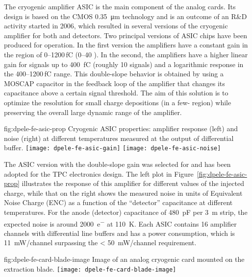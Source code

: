 The cryogenic amplifier ASIC is the main component of the  analog cards. Its design is based on the CMOS \SI{0.35}{\micro\meter} technology and is an outcome of an R\&D  activity started in 2006, which resulted in several versions of the cryogenic amplifier for both \single and \dual {} detectors. Two principal versions of ASIC chips have been produced for \dual {} operation. In the first version the amplifiers have a constant gain in the region of \numrange{0}{1200}\,\si{\femto\coulomb} (\numrange{0}{40} ). In the second, the amplifiers have a higher linear gain for signals up to \SI{400}{\femto\coulomb} (roughly \num{10}  signals) and a logarithmic response in the \numrange{400}{1200}\,\si{\femto\coulomb} range. This double-slope behavior is obtained by using a MOSCAP capacitor in the feedback loop of the amplifier that changes its capacitance above a certain signal threshold. The aim of this solution is to optimize the resolution for small charge depositions (in a few- region) while preserving the overall large dynamic range of the amplifier.

\begin{dunefigure}{fig:dpele-fe-asic-prop}
{Cryogenic  ASIC properties: amplifier response (left) and noise (right) at different temperatures measured at the output of differential buffer.}
\texttt{[image: dpele-fe-asic-gain]}
\texttt{[image: dpele-fe-asic-noise]}
\end{dunefigure}

The ASIC version with the double-slope gain was selected for  and has been adopted for the \dual TPC electronics design. The left plot in Figure~\ref{fig:dpele-fe-asic-prop} illustrates the response of this amplifier for different values of the injected charge, while that on the right shows the measured noise in units of Equivalent Noise Charge (ENC) as a function of the ``detector'' capacitance at different temperatures. 
For the  anode (detector) capacitance of \SI{480}{\pico\farad} per \SI{3}{\metre} strip, the expected noise is around \SI{2000}{e^{-}} at \SI{110}{\kelvin}. Each ASIC contains \num{16} amplifier channels with differential line buffers and has a power consumption, which is \SI{11}{\milli\watt/channel} surpassing the \SI{< 50}{\milli\watt/channel} requirement. 

\begin{dunefigure}{fig:dpele-fe-card-blade-image}
{Image of an analog cryogenic  card mounted on the extraction blade.}
\texttt{[image: dpele-fe-card-blade-image]}
\end{dunefigure}

